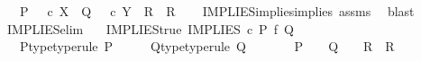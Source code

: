 \begin{isabellebody}
\ \ \ {\isachardoublequoteopen}{\isacharparenleft}{\kern0pt}P\ {\isacharequal}{\kern0pt}\ {\isasymt}\ {\isasymcirc}\isactrlsub c\ {\isasymbeta}\isactrlbsub X\isactrlesub {\isacharparenright}{\kern0pt}\ {\isasymLongrightarrow}\ {\isacharparenleft}{\kern0pt}{\isacharparenleft}{\kern0pt}Q\ {\isacharequal}{\kern0pt}\ {\isasymt}\ {\isasymcirc}\isactrlsub c\ {\isasymbeta}\isactrlbsub Y\isactrlesub {\isacharparenright}{\kern0pt}\ {\isasymLongrightarrow}\ R{\isacharparenright}{\kern0pt}\ {\isasymLongrightarrow}\ R{\isachardoublequoteclose}\isanewline
%
\isadelimproof
\ \ %
\endisadelimproof
%
\isatagproof
{}\isamarkupfalse%
\ IMPLIES{\isacharunderscore}{\kern0pt}implies{\isacharunderscore}{\kern0pt}implies\ assms\ \isamarkupfalse%
\ blast%
\endisatagproof
{\isafoldproof}%
%
\isadelimproof
\isanewline
%
\endisadelimproof
\isanewline
{}\isamarkupfalse%
\ IMPLIES{\isacharunderscore}{\kern0pt}elim{\isacharprime}{\kern0pt}{\isacharprime}{\kern0pt}{\isacharcolon}{\kern0pt}\isanewline
\ \ \ IMPLIES{\isacharunderscore}{\kern0pt}true{\isacharcolon}{\kern0pt}\ {\isachardoublequoteopen}IMPLIES\ {\isasymcirc}\isactrlsub c\ {\isacharparenleft}{\kern0pt}P\ {\isasymtimes}\isactrlsub f\ Q{\isacharparenright}{\kern0pt}\ {\isacharequal}{\kern0pt}\ {\isasymt}{\isachardoublequoteclose}\isanewline
\ \ \ P{\isacharunderscore}{\kern0pt}type{\isacharbrackleft}{\kern0pt}type{\isacharunderscore}{\kern0pt}rule{\isacharbrackright}{\kern0pt}{\isacharcolon}{\kern0pt}\ {\isachardoublequoteopen}P\ {\isacharcolon}{\kern0pt}\ {\isasymone}\ {\isasymrightarrow}\ {\isasymOmega}{\isachardoublequoteclose}\ \ Q{\isacharunderscore}{\kern0pt}type{\isacharbrackleft}{\kern0pt}type{\isacharunderscore}{\kern0pt}rule{\isacharbrackright}{\kern0pt}{\isacharcolon}{\kern0pt}\ {\isachardoublequoteopen}Q\ {\isacharcolon}{\kern0pt}\ {\isasymone}\ {\isasymrightarrow}\ {\isasymOmega}{\isachardoublequoteclose}\isanewline
\ \ \ {\isachardoublequoteopen}{\isacharparenleft}{\kern0pt}P\ {\isacharequal}{\kern0pt}\ {\isasymt}{\isacharparenright}{\kern0pt}\ {\isasymLongrightarrow}\ {\isacharparenleft}{\kern0pt}{\isacharparenleft}{\kern0pt}Q\ {\isacharequal}{\kern0pt}\ {\isasymt}{\isacharparenright}{\kern0pt}\ {\isasymLongrightarrow}\ R{\isacharparenright}{\kern0pt}\ {\isasymLongrightarrow}\ R{\isachardoublequoteclose}\isanewline
%
\isadelimproof
%
\endisadelimproof
%
\isatagproof
{}\isamarkupfalse%
\ {\isacharminus}{\kern0pt}\isanewline
\ \ \isamarkupfalse%

\end{isabellebody}
